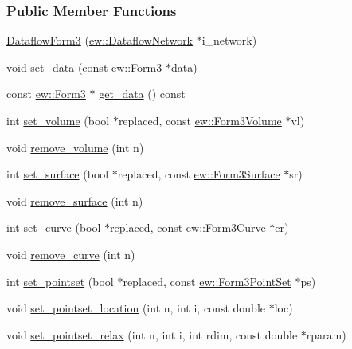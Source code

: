\subsubsection*{Public Member Functions}
\begin{DoxyCompactItemize}
\item 
\hyperlink{classew_1_1DataflowForm3_aecb15fc6bd28560fa8dafcf6a2cb0ec0}{DataflowForm3} (\hyperlink{classew_1_1DataflowNetwork}{ew::DataflowNetwork} $\ast$i\_\-network)
\item 
void \hyperlink{classew_1_1DataflowForm3_a4efca0bcc9455856e1e5158262804a5e}{set\_\-data} (const \hyperlink{classew_1_1Form3}{ew::Form3} $\ast$data)
\item 
const \hyperlink{classew_1_1Form3}{ew::Form3} $\ast$ \hyperlink{classew_1_1DataflowForm3_a22276b5dc185fec2755c738462d583ce}{get\_\-data} () const 
\item 
int \hyperlink{classew_1_1DataflowForm3_a2b96dfb011fcb937f8663305c99a6559}{set\_\-volume} (bool $\ast$replaced, const \hyperlink{classew_1_1Form3Volume}{ew::Form3Volume} $\ast$vl)
\item 
void \hyperlink{classew_1_1DataflowForm3_a47a6c489b99dac0008982202c49905f1}{remove\_\-volume} (int n)
\item 
int \hyperlink{classew_1_1DataflowForm3_a594e80da7f80db8fc1a7be5ae818002b}{set\_\-surface} (bool $\ast$replaced, const \hyperlink{classew_1_1Form3Surface}{ew::Form3Surface} $\ast$sr)
\item 
void \hyperlink{classew_1_1DataflowForm3_a7ac39098b59bf186401646e5242b6dde}{remove\_\-surface} (int n)
\item 
int \hyperlink{classew_1_1DataflowForm3_ad767440f3efb381c6f19311ae8deb6bd}{set\_\-curve} (bool $\ast$replaced, const \hyperlink{classew_1_1Form3Curve}{ew::Form3Curve} $\ast$cr)
\item 
void \hyperlink{classew_1_1DataflowForm3_a12c6b8481bf7f30a3b83345fc3102247}{remove\_\-curve} (int n)
\item 
int \hyperlink{classew_1_1DataflowForm3_aab8125aabb9eb23fa6292b61b5f39a03}{set\_\-pointset} (bool $\ast$replaced, const \hyperlink{classew_1_1Form3PointSet}{ew::Form3PointSet} $\ast$ps)
\item 
void \hyperlink{classew_1_1DataflowForm3_a5690394f7004a0d8b6799a736c6e485f}{set\_\-pointset\_\-location} (int n, int i, const double $\ast$loc)
\item 
void \hyperlink{classew_1_1DataflowForm3_aec5d6d3b7e412960fcce347ff9dff063}{set\_\-pointset\_\-relax} (int n, int i, int rdim, const double $\ast$rparam)

\end{DoxyCompactItemize}
